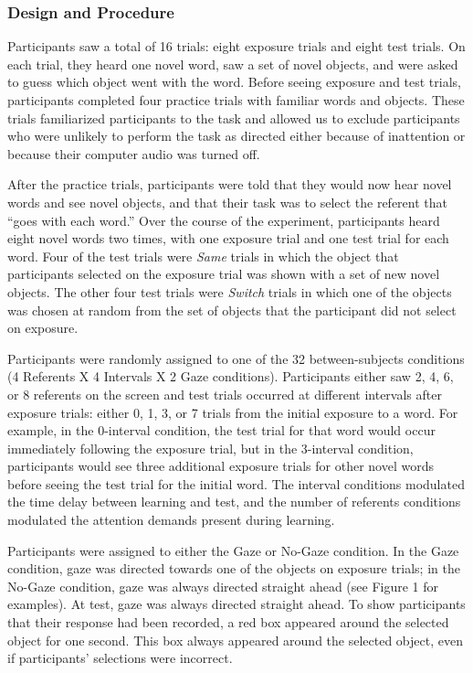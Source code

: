 \documentclass[authoryear, review]{elsarticle}
\begin{document}
\subsubsection{Design and Procedure}\label{design-and-procedure}

Participants saw a total of 16 trials: eight exposure trials and eight
test trials. On each trial, they heard one novel word, saw a set of
novel objects, and were asked to guess which object went with the word.
Before seeing exposure and test trials, participants completed four
practice trials with familiar words and objects. These trials
familiarized participants to the task and allowed us to exclude
participants who were unlikely to perform the task as directed either
because of inattention or because their computer audio was turned off.

After the practice trials, participants were told that they would now
hear novel words and see novel objects, and that their task was to
select the referent that ``goes with each word.'' Over the course of the
experiment, participants heard eight novel words two times, with one
exposure trial and one test trial for each word. Four of the test trials
were \emph{Same} trials in which the object that participants selected
on the exposure trial was shown with a set of new novel objects. The
other four test trials were \emph{Switch} trials in which one of the
objects was chosen at random from the set of objects that the
participant did not select on exposure.

Participants were randomly assigned to one of the 32 between-subjects
conditions (4 Referents X 4 Intervals X 2 Gaze conditions). Participants
either saw 2, 4, 6, or 8 referents on the screen and test trials
occurred at different intervals after exposure trials: either 0, 1, 3,
or 7 trials from the initial exposure to a word. For example, in the
0-interval condition, the test trial for that word would occur
immediately following the exposure trial, but in the 3-interval
condition, participants would see three additional exposure trials for
other novel words before seeing the test trial for the initial word. The
interval conditions modulated the time delay between learning and test,
and the number of referents conditions modulated the attention demands
present during learning.

Participants were assigned to either the Gaze or No-Gaze condition. In
the Gaze condition, gaze was directed towards one of the objects on
exposure trials; in the No-Gaze condition, gaze was always directed
straight ahead (see Figure 1 for examples). At test, gaze was always
directed straight ahead. To show participants that their response had
been recorded, a red box appeared around the selected object for one
second. This box always appeared around the selected object, even if
participants' selections were incorrect.
\end{document}
